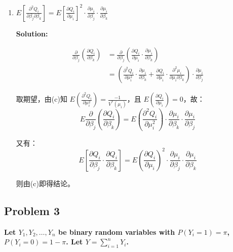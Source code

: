 \begin{enumerate}
\bigskip

\item[(d)] $E\left[\frac{\partial^2 Q_i}{\partial \beta_j \partial \beta_k}\right] = E\left[\frac{\partial Q_i}{\partial \mu_i}\right]^2 \cdot \frac{\partial \mu_i}{\partial \beta_j} \cdot \frac{\partial \mu_i}{\partial \beta_k}$

\textbf{Solution:}

\begin{align*}
\frac{\partial}{\partial \beta_j}\left(\frac{\partial Q_i}{\partial \beta_k}\right) &= \frac{\partial}{\partial \beta_j}\left(\frac{\partial Q_i}{\partial \mu_i} \cdot \frac{\partial \mu_i}{\partial \beta_k}\right) \\
&= \left(\frac{\partial^2 Q_i}{\partial \mu_i^2} \cdot \frac{\partial \mu_i}{\partial \beta_k} + \frac{\partial Q_i}{\partial \mu_i} \cdot \frac{\partial^2 \mu_i}{\partial \mu_i \partial \beta_k}\right) \cdot \frac{\partial \mu_i}{\partial \beta_j}
\end{align*}

取期望，由(c)知 $E\left(\frac{\partial^2 Q_i}{\partial \mu_i^2}\right) = \frac{-1}{V^*(\mu_i)}$，且 $E\left(\frac{\partial Q_i}{\partial \mu_i}\right) = 0$，故：
\[
E \frac{\partial}{\partial \beta_j}\left(\frac{\partial Q_i}{\partial \beta_k}\right) = E\left(\frac{\partial^2 Q_i}{\partial \mu_i^2}\right) \cdot \frac{\partial \mu_i}{\partial \beta_k} \cdot \frac{\partial \mu_i}{\partial \beta_j}
\]

又有：
\[
E\left[\frac{\partial Q_i}{\partial \beta_j} \cdot \frac{\partial Q_i}{\partial \beta_k}\right] = E\left(\frac{\partial Q_i}{\partial \mu_i}\right)^2 \cdot \frac{\partial \mu_i}{\partial \beta_j} \cdot \frac{\partial \mu_i}{\partial \beta_k}
\]

则由(c)即得结论。
\end{enumerate}

\subsection{Problem 3}

\textbf{Let $Y_1, Y_2, \ldots, Y_n$ be binary random variables with $P(Y_i = 1) = \pi$, $P(Y_i = 0) = 1 - \pi$. Let $Y = \sum_{i=1}^n Y_i$.}

